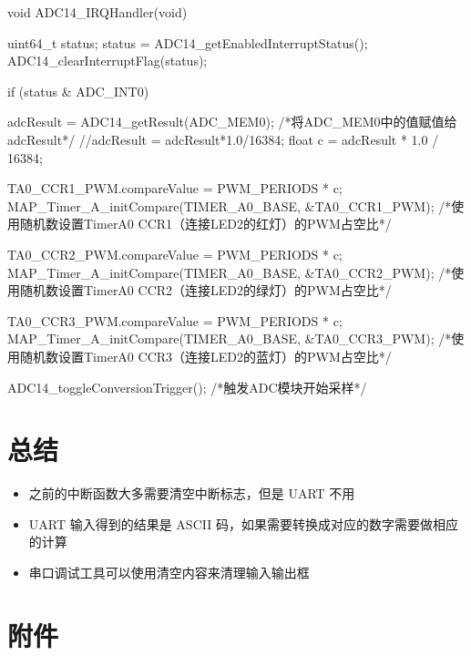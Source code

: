 \documentclass[a4paper,10pt,UTF8]{paper}
\numberwithin{equation}{section}
\numberwithin{figure}{section}
\begin{document}
\begin{ccode}
    void ADC14_IRQHandler(void)
    {
        uint64_t status;
        status = ADC14_getEnabledInterruptStatus();
        ADC14_clearInterruptFlag(status);

        if (status & ADC_INT0)
        {
            adcResult = ADC14_getResult(ADC_MEM0); /*将ADC_MEM0中的值赋值给adcResult*/
            //adcResult = adcResult*1.0/16384;
            float c = adcResult * 1.0 / 16384;

            TA0_CCR1_PWM.compareValue = PWM_PERIODS * c;
            MAP_Timer_A_initCompare(TIMER_A0_BASE, &TA0_CCR1_PWM); /*使用随机数设置TimerA0 CCR1（连接LED2的红灯）的PWM占空比*/

            TA0_CCR2_PWM.compareValue = PWM_PERIODS * c;
            MAP_Timer_A_initCompare(TIMER_A0_BASE, &TA0_CCR2_PWM); /*使用随机数设置TimerA0 CCR2（连接LED2的绿灯）的PWM占空比*/

            TA0_CCR3_PWM.compareValue = PWM_PERIODS * c;
            MAP_Timer_A_initCompare(TIMER_A0_BASE, &TA0_CCR3_PWM); /*使用随机数设置TimerA0 CCR3（连接LED2的蓝灯）的PWM占空比*/

            ADC14_toggleConversionTrigger(); /*触发ADC模块开始采样*/
        }
    }

\end{ccode}

\section{总结}
    
\begin{itemize}
    \item 之前的中断函数大多需要清空中断标志，但是 UART 不用
    \item UART 输入得到的结果是 ASCII 码，如果需要转换成对应的数字需要做相应的计算
    \item 串口调试工具可以使用清空内容来清理输入输出框
\end{itemize}
  
\section{附件}
\end{document}
